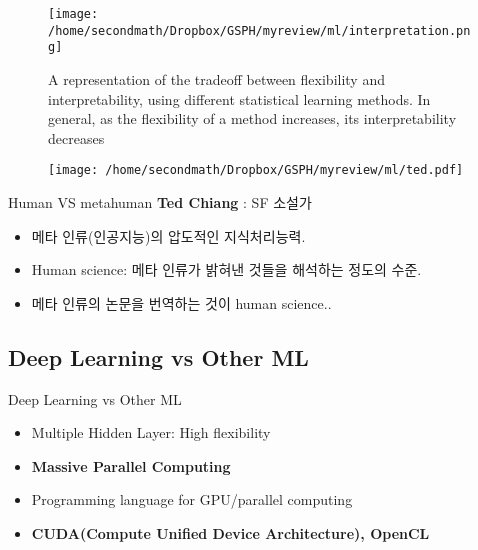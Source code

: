 \documentclass{beamer}
\begin{document}
\begin{frame}
\begin{figure}
\texttt{[image: /home/secondmath/Dropbox/GSPH/myreview/ml/interpretation.png]}
\caption{A representation of the tradeoff between flexibility and interpretability,
using different statistical learning methods. In general, as the flexibility
of a method increases, its interpretability decreases\citep{james2013introduction}}
\end{figure}
\end{frame}


\begin{frame}
\begin{figure}
\texttt{[image: /home/secondmath/Dropbox/GSPH/myreview/ml/ted.pdf]}
\end{figure}
\end{frame}

\begin{frame}{Human VS metahuman\citep{chiang2000catching}}
\textbf{Ted Chiang} : SF 소설가 
\begin{itemize}
\item 메타 인류(인공지능)의 압도적인 지식처리능력. 
\item Human science: 메타 인류가 밝혀낸 것들을 해석하는 정도의 수준. 
\item 메타 인류의 논문을 번역하는 것이 human science..
\end{itemize}
\end{frame}


\subsection{Deep Learning vs Other ML}
\begin{frame}{Deep Learning vs Other ML}
\begin{itemize}
  \item Multiple Hidden Layer: High flexibility
  \item \textbf{Massive Parallel Computing}
\end{itemize}

\begin{itemize}
  \item Programming language for GPU/parallel computing
  \item \textbf{ CUDA(Compute Unified Device Architecture), OpenCL}\citep{nvidia2007compute,stone2010opencl}
\end{itemize}
\end{frame}
\end{document}
